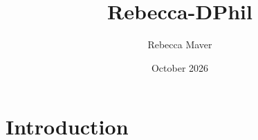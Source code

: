 \documentclass{article}
\title{Rebecca-DPhil}
\author{Rebecca Maver}
\date{October 2026}
\begin{document}
\maketitle

\section{Introduction}
\end{document}

